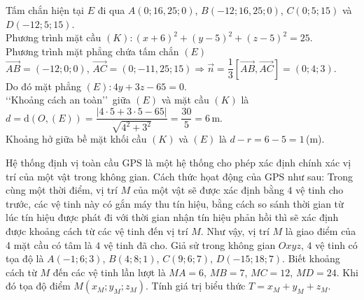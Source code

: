 \begin{bt}
{		Tấm  chắn hiện tại $E$ đi qua $A(0;16{,}25;0)$, $B(-12;16{,}25;0)$, $C(0;5;15)$ và $D(-12;5;15)$. \\
		Phương trình mặt cầu  $(K)\colon (x+6)^2+(y-5)^2+(z-5)^2=25$. \\
		Phương  trình mặt phẳng chứa tấm chắn $(E)$ \\
		 $\overrightarrow{AB}=(-12;0;0)$, $\overrightarrow{AC}=(0;-11,25;15)\Rightarrow\overrightarrow{n}=\dfrac{1}{3}\left[\overrightarrow{AB},\overrightarrow{AC}\right]=(0;4;3)$. \\
		 Do đó mặt phẳng $(E)\colon 4y+3z-65=0$. \\
		\lq\lq Khoảng cách an toàn\rq\rq~giữa $(E)$ và mặt cầu $(K)$ là $d=\mathrm{d}(O,(E))=\dfrac{|4\cdot5+3\cdot5-65|}{\sqrt{4^2+3^2}}=\dfrac{30}{5}=6$\,m.  \\
		Khoảng hở giữa bề mặt khối cầu  $(K)$ và $(E)$ là $d-r=6-5=1$\,(m).
	 }
\end{bt}

\begin{bt}%
	Hệ thống định vị toàn cầu GPS là một hệ thống cho phép xác định chính xác vị trí của một vật trong không gian. Cách thức họat động của GPS như sau: Trong cùng một thời điểm, vị trí $M$ của một vật sẽ được xác định bằng $4$ vệ tinh cho trước, các vệ tinh này có gắn máy thu tín hiệu, bằng cách so sánh thời gian từ lúc tín hiệu được phát đi với thời gian nhận tín hiệu phản hồi thì sẽ xác định được khoảng cách từ các vệ tinh đến vị trí $M$. Như vậy, vị trí $M$ là giao điểm của 4 mặt cầu có tâm là $4$ vệ tinh đã cho. Giả sử trong không gian $Oxyz$, $4$ vệ tinh có tọa độ là $A(-1;6;3)$, $B(4;8;1)$, $C(9;6;7)$, $D(-15;18;7)$. Biết khoảng cách từ $M$ đến các vệ tinh lần lượt là $MA=6$, $MB=7$, $MC=12$, $MD=24$. Khi đó  tọa độ điểm $M\left(x_M;y_M;z_M\right)$. Tính giá trị biểu thức $T=x_M+y_M+z_M$.
\end{bt}

